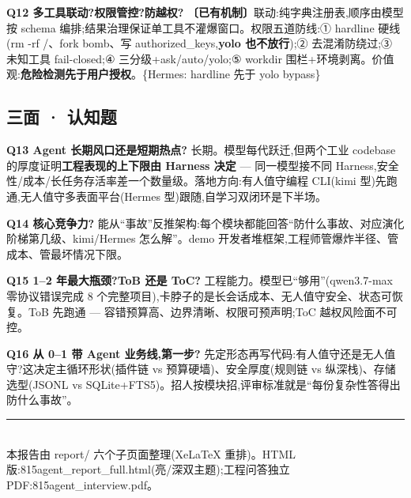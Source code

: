 \documentclass[10pt,a4paper]{article}
\renewcommand{\footnotesize}{\fontsize{7.5}{10.5}\selectfont}
\newcommand{\tagref}[1]{\textcolor{dimc}{\footnotesize\{#1\}}}
\begin{document}
\textbf{Q12 多工具联动?权限管控?防越权?} \textcolor{okc}{\textbf{〔已有机制〕}}联动:纯字典注册表,顺序由模型按 schema 编排;结果治理保证单工具不灌爆窗口。权限五道防线:① hardline 硬线(rm -rf /、fork bomb、写 authorized\_keys,\textbf{yolo 也不放行});② 去混淆防绕过;③ 未知工具 fail-closed;④ 三分级+ask/auto/yolo;⑤ workdir 围栏+环境剥离。价值观:\textbf{危险检测先于用户授权}。\tagref{Hermes: hardline 先于 yolo bypass}

\subsection{三面 · 认知题}
\textbf{Q13 Agent 长期风口还是短期热点?} 长期。模型每代跃迁,但两个工业 codebase 的厚度证明\textbf{工程表现的上下限由 Harness 决定} --- 同一模型接不同 Harness,安全性/成本/长任务存活率差一个数量级。落地方向:有人值守编程 CLI(kimi 型)先跑通,无人值守多表面平台(Hermes 型)跟随,自学习双闭环是下半场。

\textbf{Q14 核心竞争力?} 能从``事故''反推架构:每个模块都能回答``防什么事故、对应演化阶梯第几级、kimi/Hermes 怎么解''。demo 开发者堆框架,工程师管爆炸半径、管成本、管最坏情况下限。

\textbf{Q15 1--2 年最大瓶颈?ToB 还是 ToC?} 工程能力。模型已``够用''(qwen3.7-max 零协议错误完成 8 个完整项目),卡脖子的是长会话成本、无人值守安全、状态可恢复。ToB 先跑通 --- 容错预算高、边界清晰、权限可预声明;ToC 越权风险面不可控。

\textbf{Q16 从 0--1 带 Agent 业务线,第一步?} 先定形态再写代码:有人值守还是无人值守?这决定主循环形状(插件链 vs 预算硬墙)、安全厚度(规则链 vs 纵深栈)、存储选型(JSONL vs SQLite+FTS5)。招人按模块招,评审标准就是``每份复杂性答得出防什么事故''。

\vspace{6pt}
{\footnotesize\color{dimc}\rule{\textwidth}{0.4pt}\\
本报告由 report/ 六个子页面整理(XeLaTeX 重排)。HTML 版:815agent\_report\_full.html(亮/深双主题);工程问答独立 PDF:815agent\_interview.pdf。}
\end{document}
